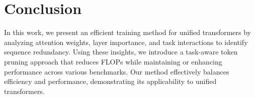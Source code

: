 \section{Conclusion}







In this work, we present an efficient training method for unified transformers by analyzing attention weights, layer importance, and task interactions to identify sequence redundancy. Using these insights, we introduce a task-aware token pruning approach that reduces FLOPs while maintaining or enhancing performance across various benchmarks. Our method effectively balances efficiency and performance, demonstrating its applicability to unified transformers.